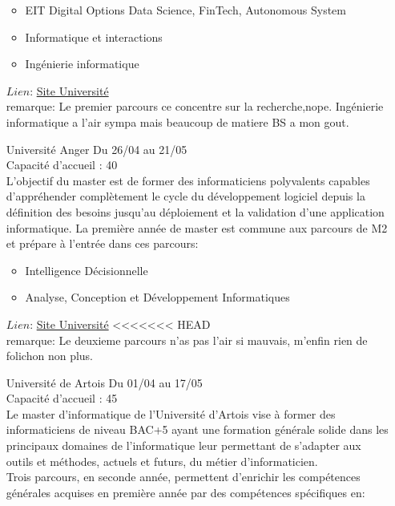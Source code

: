 \documentclass[a4paper,11pt]{article}
\begin{document}
\begin{enumerate}
                \begin{itemize}
                    \item EIT Digital Options Data Science, FinTech, Autonomous System
                    \item Informatique et interactions
                    \item Ingénierie informatique
                \end{itemize}
                $Lien$: \href{https://univ-cotedazur.fr/offre-de-formation/master-informatique-1}{Site Université}
                \\remarque: Le premier parcours ce concentre sur la recherche,nope. Ingénierie informatique a l'air sympa mais beaucoup de matiere BS a mon gout.
\\
        \item [\color{LightOrangeHaf}Université Anger] Du 26/04 au 21/05
                \\Capacité d'accueil : 40
                \\L’objectif du master est de former des informaticiens polyvalents capables d’appréhender complètement le cycle du développement logiciel depuis la définition des besoins jusqu’au déploiement et la validation d’une application informatique. La première année de master est commune aux parcours de M2 et prépare à l'entrée dans ces parcours:
                \begin{itemize}
                    \item Intelligence Décisionnelle
                    \item Analyse, Conception et Développement Informatiques
                \end{itemize}
                $Lien$: \href{http://www.info.univ-angers.fr/dptinfo/}{Site Université}
<<<<<<< HEAD
                \\remarque: Le deuxieme parcours n'as pas l'air si mauvais, m'enfin rien de folichon non plus.
\\
        \item [\color{LightOrangeHaf}Université de Artois] Du 01/04 au 17/05
                \\Capacité d'accueil : 45
                \\Le master d'informatique de l'Université d'Artois vise à former des informaticiens de niveau BAC+5 ayant une formation générale solide dans les principaux domaines de l'informatique leur permettant de s'adapter aux outils et méthodes, actuels et futurs, du métier d'informaticien.\\Trois parcours, en seconde année, permettent d'enrichir les compétences générales acquises en première année par des compétences spécifiques en:

\end{enumerate}
\end{document}
